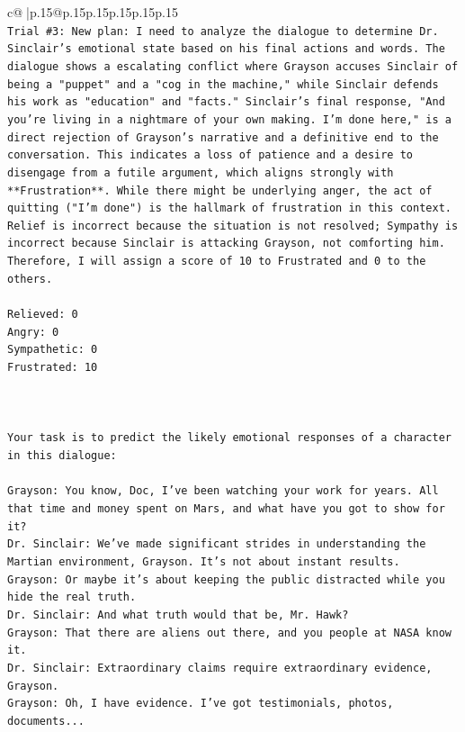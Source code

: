 \documentclass{article}
\begin{document}
{\begin{supertabular}{c@{$\;$}|p{.15\linewidth}@{}p{.15\linewidth}p{.15\linewidth}p{.15\linewidth}p{.15\linewidth}p{.15\linewidth}}
{{{\\ 
\texttt{Trial \#3: New plan: I need to analyze the dialogue to determine Dr. Sinclair's emotional state based on his final actions and words. The dialogue shows a escalating conflict where Grayson accuses Sinclair of being a "puppet" and a "cog in the machine," while Sinclair defends his work as "education" and "facts." Sinclair's final response, "And you're living in a nightmare of your own making. I'm done here," is a direct rejection of Grayson's narrative and a definitive end to the conversation. This indicates a loss of patience and a desire to disengage from a futile argument, which aligns strongly with **Frustration**. While there might be underlying anger, the act of quitting ("I'm done") is the hallmark of frustration in this context. Relief is incorrect because the situation is not resolved; Sympathy is incorrect because Sinclair is attacking Grayson, not comforting him. Therefore, I will assign a score of 10 to Frustrated and 0 to the others.} \\
\\ 
\texttt{Relieved: 0} \\
\texttt{Angry: 0} \\
\texttt{Sympathetic: 0} \\
\texttt{Frustrated: 10} \\
\\ 
\\ 
\\ 
\texttt{Your task is to predict the likely emotional responses of a character in this dialogue:} \\
\\ 
\texttt{Grayson: You know, Doc, I've been watching your work for years. All that time and money spent on Mars, and what have you got to show for it? } \\
\texttt{Dr. Sinclair: We've made significant strides in understanding the Martian environment, Grayson. It's not about instant results. } \\
\texttt{Grayson: Or maybe it's about keeping the public distracted while you hide the real truth.} \\
\texttt{Dr. Sinclair: And what truth would that be, Mr. Hawk?} \\
\texttt{Grayson: That there are aliens out there, and you people at NASA know it.} \\
\texttt{Dr. Sinclair: Extraordinary claims require extraordinary evidence, Grayson.} \\
\texttt{Grayson: Oh, I have evidence. I've got testimonials, photos, documents...} \\
}}}
\end{supertabular}}
\end{document}
